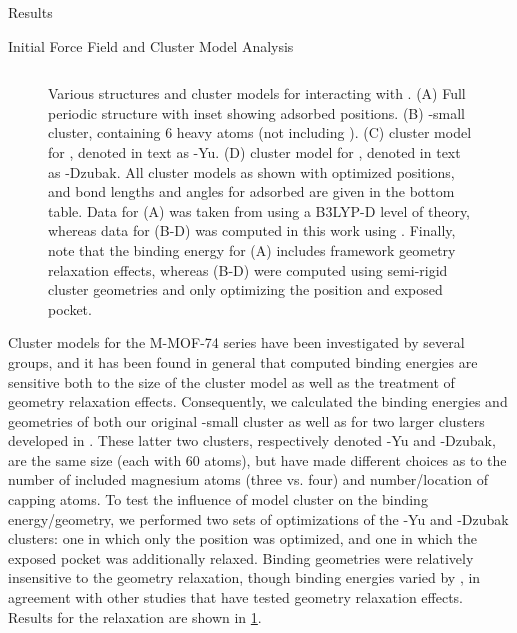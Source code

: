 \begin{section}{Results}
\begin{subsection}{Initial Force Field and Cluster Model Analysis}
\begin{figure}
\begin{tabular}{@{}lccc@{}}
    \bottomrule
    \hline
    \end{tabular}

    \caption[Model clusters for \mgmof]
{ Various structures and cluster models for \mgmof interacting with \co. 
(A) Full periodic \mgmof structure with inset showing adsorbed \co positions. 
(B) \mgmof-small cluster, containing 6 heavy atoms (not including \co). 
(C) \citeauthor{Yu2012c} cluster model for \mgmof, denoted in text as \mgmof-Yu.
(D) \citeauthor{Dzubak2012} cluster model for \mgmof, denoted in text as
\mgmof-Dzubak.
All cluster models as shown with optimized \co positions, and bond lengths and
angles for adsorbed \co are given in the bottom table. Data for (A) was taken
from \citeauthor{Valenzano2010} using a B3LYP-D level of theory,\cite{Valenzano2010}
whereas data for (B-D) was computed in this work using \pbeod. Finally, note
that the binding energy for (A) includes framework geometry relaxation effects,
whereas (B-D) were computed using semi-rigid cluster geometries and only optimizing
the \co position and exposed  pocket.
            }
    \label{fig:lmoeda-clusters}
    \end{figure}

Cluster models for the M-MOF-74 series have been investigated by several
groups, and it has been found in general that computed binding energies are
sensitive both to the size of the cluster model as well as the treatment of
geometry relaxation effects.\cite{Verma2013,Valenzano2011} Consequently, we
calculated the \co binding energies and geometries of both our original
\mgmof-small cluster as well as for two larger clusters developed in
. These latter two clusters, respectively denoted
\mgmof-Yu and \mgmof-Dzubak, are the same size (each with 60 atoms), but have
made different choices as to the number of included magnesium atoms (three vs.
four) and number/location of capping atoms. To test the influence of model
cluster on the \co binding energy/geometry, we performed two sets of
optimizations of the \mgmof-Yu and \mgmof-Dzubak clusters: one in which only
the \co position was optimized, and one in which the exposed  pocket
was additionally relaxed. Binding geometries were relatively insensitive to
the geometry relaxation, though binding energies varied by , in
agreement with other studies that have tested geometry
relaxation effects.\cite{Verma2013} Results for the  relaxation are shown in
\cref{fig:lmoeda-clusters}. 


\end{subsection}
\end{section}

